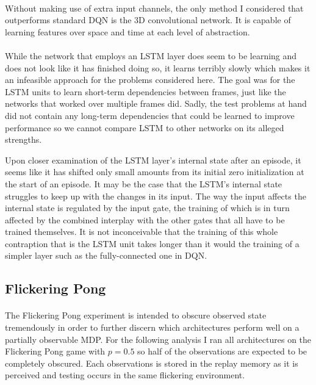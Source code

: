 \paragraph{}
Without making use of extra input channels,
the only method I considered that outperforms standard DQN
is the 3D convolutional network.
It is capable of learning features over space and time
at each level of abstraction.

\paragraph{}
While the network that employs an LSTM layer
does seem to be learning
and does not look like it has finished doing so,
it learns terribly slowly
which makes it an infeasible approach
for the problems considered here.
The goal was for the LSTM units
to learn short-term dependencies between frames,
just like the networks that worked over multiple frames did.
Sadly,
the test problems at hand did not contain any long-term dependencies
that could be learned to improve performance
so we cannot compare LSTM to other networks
on its alleged strengths.

Upon closer examination of the LSTM layer's internal state
after an episode,
it seems like it has shifted only small amounts
from its initial zero initialization
at the start of an episode.
It may be the case that the LSTM's internal state
struggles to keep up with the changes in its input.
The way the input affects the internal state
is regulated by the input gate,
the training of which is in turn affected
by the combined interplay with the other gates
that all have to be trained themselves.
It is not inconceivable that the training
of this whole contraption that is the LSTM unit
takes longer than
it would the training of a simpler layer
such as the fully-connected one in DQN.

\subsection{Flickering Pong}
\label{sub:comb_flickering_pong}
\paragraph{}
The Flickering Pong experiment
is intended to obscure observed state tremendously
in order to further discern which architectures
perform well on a partially observable MDP.
For the following analysis
I ran all architectures
on the Flickering Pong game with $p=0.5$
so half of the observations are expected to be completely obscured.
Each observations is stored in the replay memory as it is perceived
and testing occurs in the same flickering environment.

